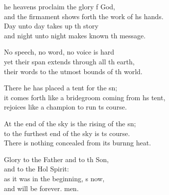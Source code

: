 \settowidth{\versewidth}{it comes forth like a bridegroom coming from his tent, *}
\begin{psalmverse}%
  \begin{patverse}
he heavens proclaim the glory f God,\Med\\
and the firmament shows forth the work of h\pointup{\i}s hands.\\
Day unto day takes up th story\Med\\
and night unto night makes known th message.

No speech, no word, no voice is hard\Flex\\
yet their span extends through all th earth,\Med\\
their words to the utmost bounds of th world.

There he has placed a tent for the sn;\Flex\\
it comes forth like a bridegroom coming from hs tent,\Med\\
rejoices like a champion to run \pointup{\i}ts course.

At the end of the sky is the rising of the sn;\Flex\\
to the furthest end of the sky is ts course.\Med\\
There is nothing concealed from its burn\pointup{\i}ng heat.

Glory to the Father and to th Son,\Med\\
and to the Hol Spirit:\\
as it was in the beginning, s now,\Med\\
and will be forever. men. 
  \end{patverse}
\end{psalmverse}
